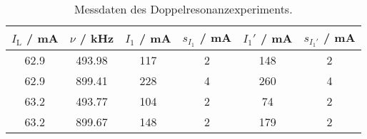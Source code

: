 \begin{table}[H]
\caption{Messdaten des Doppelresonanzexperiments.}
\begin{center}
\begin{tabular}{|c|c|c|c|c|c|}
  \hline
  $I_\text{L}$ / mA & $\nu$ / kHz & $I_1$ / mA & $s_{I_1}$ / mA & $I_1'$ / mA & $s_{I_1'}$ / mA \\ \hline
  62.9 & 493.98 & 117 & 2 & 148 & 2 \\ \hline
  62.9 & 899.41 & 228 & 4 & 260 & 4 \\ \hline
  63.2 & 493.77 & 104 & 2 & 74 & 2 \\ \hline
  63.2 & 899.67 & 148 & 2 & 179 & 2 \\ \hline
\end{tabular}
\end{center}
\label{tab:part3:data}
\end{table}
